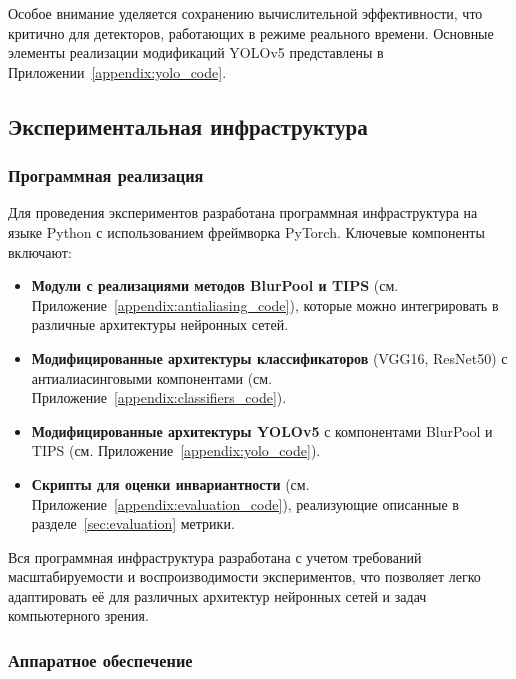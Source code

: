 Особое внимание уделяется сохранению вычислительной эффективности, что критично для детекторов, работающих в режиме реального времени. Основные элементы реализации модификаций YOLOv5 представлены в Приложении~\ref{appendix:yolo_code}.

\subsection{Экспериментальная инфраструктура}
\label{sec:infrastructure}

\subsubsection{Программная реализация}
\label{sec:implementation}

Для проведения экспериментов разработана программная инфраструктура на языке Python с использованием фреймворка PyTorch. Ключевые компоненты включают:

\begin{itemize}
    \item \textbf{Модули с реализациями методов BlurPool и TIPS} (см. Приложение~\ref{appendix:antialiasing_code}), которые можно интегрировать в различные архитектуры нейронных сетей.
    
    \item \textbf{Модифицированные архитектуры классификаторов} (VGG16, ResNet50) с антиалиасинговыми компонентами (см. Приложение~\ref{appendix:classifiers_code}).
    
    \item \textbf{Модифицированные архитектуры YOLOv5} с компонентами BlurPool и TIPS (см. Приложение~\ref{appendix:yolo_code}).
    
    \item \textbf{Скрипты для оценки инвариантности} (см. Приложение~\ref{appendix:evaluation_code}), реализующие описанные в разделе~\ref{sec:evaluation} метрики.
\end{itemize}

Вся программная инфраструктура разработана с учетом требований масштабируемости и воспроизводимости экспериментов, что позволяет легко адаптировать её для различных архитектур нейронных сетей и задач компьютерного зрения.

\subsubsection{Аппаратное обеспечение}
\label{sec:hardware}


